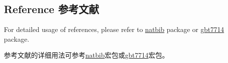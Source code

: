 \subsection{Reference 参考文献}

\begin{ParaColumn}

    For detailed usage of references, please refer to \href{https://www.ctan.org/pkg/natbib}{natbib} package or \href{https://www.ctan.org/pkg/gbt7714}{gbt7714} package.

    \switchcolumn

    参考文献的详细用法可参考\href{https://www.ctan.org/pkg/natbib}{natbib}宏包或\href{https://www.ctan.org/pkg/gbt7714}{gbt7714}宏包。

\end{ParaColumn}